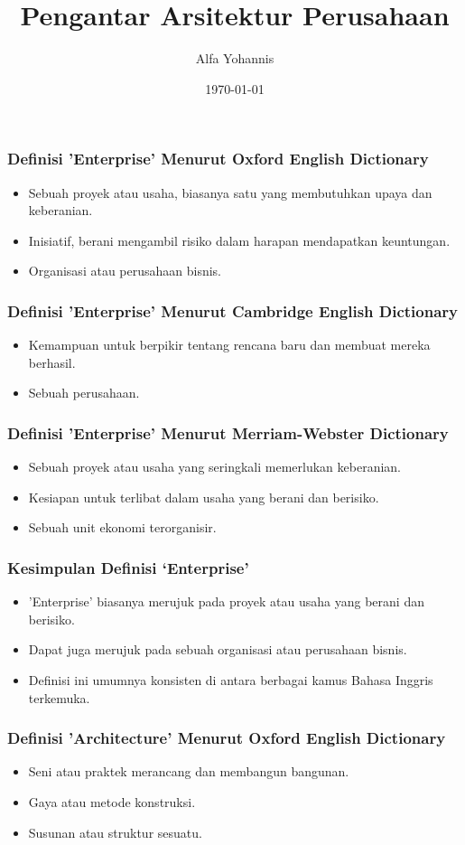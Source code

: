 \documentclass{beamer}
\title{Pengantar Arsitektur Perusahaan}
\author{Alfa Yohannis}
\date{\today}
\begin{document}
	
	\frame{\titlepage}
	
	\begin{frame}
		\frametitle{Definisi 'Enterprise' Menurut Oxford English Dictionary}
		\begin{itemize}
			\item Sebuah proyek atau usaha, biasanya satu yang membutuhkan upaya dan keberanian.
			\item Inisiatif, berani mengambil risiko dalam harapan mendapatkan keuntungan.
			\item Organisasi atau perusahaan bisnis.
		\end{itemize}
	\end{frame}
	
	\begin{frame}
		\frametitle{Definisi 'Enterprise' Menurut Cambridge English Dictionary}
		\begin{itemize}
			\item Kemampuan untuk berpikir tentang rencana baru dan membuat mereka berhasil.
			\item Sebuah perusahaan.
		\end{itemize}
	\end{frame}
	
	\begin{frame}
		\frametitle{Definisi 'Enterprise' Menurut Merriam-Webster Dictionary}
		\begin{itemize}
			\item Sebuah proyek atau usaha yang seringkali memerlukan keberanian.
			\item Kesiapan untuk terlibat dalam usaha yang berani dan berisiko.
			\item Sebuah unit ekonomi terorganisir.
		\end{itemize}
	\end{frame}
	
	\begin{frame}
		\frametitle{Kesimpulan Definisi `Enterprise'}
		\begin{itemize}
			\item 'Enterprise' biasanya merujuk pada proyek atau usaha yang berani dan berisiko.
			\item Dapat juga merujuk pada sebuah organisasi atau perusahaan bisnis.
			\item Definisi ini umumnya konsisten di antara berbagai kamus Bahasa Inggris terkemuka.
		\end{itemize}
	\end{frame}
	
	\begin{frame}
		\frametitle{Definisi 'Architecture' Menurut Oxford English Dictionary}
		\begin{itemize}
			\item Seni atau praktek merancang dan membangun bangunan.
			\item Gaya atau metode konstruksi.
			\item Susunan atau struktur sesuatu.
		\end{itemize}
	\end{frame}
	
\end{document}
